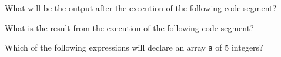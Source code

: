 \documentclass[11pt]{examdesign}
\begin{document}
\begin{multiplechoice}[title={},suppressprefix=yes,rearrange=yes]
  
\begin{question}
What will be the output after the execution of the following code segment?
\end{question}
  
\begin{question}
What is the result from the execution of the following code segment?
\end{question}
  
\begin{question}
Which of the following expressions will declare an array \texttt{a} of 5
integers?
\end{question}
  
\end{multiplechoice}
\end{document}
